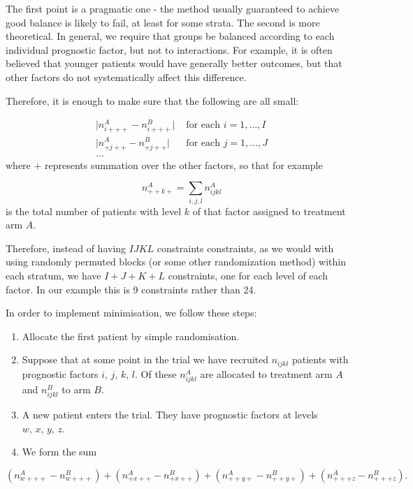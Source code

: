 \documentclass[
  openany]{book}
\providecommand{\tightlist}{%
  \setlength{\itemsep}{0pt}\setlength{\parskip}{0pt}}
\theoremstyle{definition}
\theoremstyle{definition}
\theoremstyle{definition}
\theoremstyle{definition}
\theoremstyle{remark}
\begin{document}
The first point is a pragmatic one - the method usually guaranteed to achieve good balance is likely to fail, at least for some strata. The second is more theoretical. In general, we require that groups be balanced according to each individual prognostic factor, but not to interactions. For example, it is often believed that younger patients would have generally better outcomes, but that other factors do not systematically affect this difference.

Therefore, it is enough to make sure that the following are all small:

\[
\begin{aligned}
\lvert n^A_{i+++} - n^B_{i+++} \rvert&\text{ for each }i=1,\ldots,I\\
\lvert n^A_{+j++} - n^B_{+j++} \rvert&\text{ for each }j=1,\ldots,J\\
\ldots&
\end{aligned}
\]
where \(+\) represents summation over the other factors, so that for example

\[n^A_{++k+} = \sum\limits_{i,j,l}{n^A_{ijkl}}\]
is the total number of patients with level \(k\) of that factor assigned to treatment arm \(A\).

Therefore, instead of having \(IJKL\) constraints constraints, as we would with using randomly permuted blocks (or some other randomization method) within each stratum, we have \(I+J+K+L\) constraints, one for each level of each factor. In our example this is 9 constraints rather than 24.

In order to implement minimisation, we follow these steps:

\begin{enumerate}
\def\labelenumi{\arabic{enumi}.}
\tightlist
\item
  Allocate the first patient by simple randomisation.
\item
  Suppose that at some point in the trial we have recruited \(n_{ijkl}\) patients with prognostic factors \(i,\,j,\,k,\,l\). Of these \(n^A_{ijkl}\) are allocated to treatment arm \(A\) and \(n^B_{ijkl}\) to arm \(B\).
\item
  A new patient enters the trial. They have prognostic factors at levels \(w,\,x,\,y,\,z\).
\item
  We form the sum
\end{enumerate}

\begin{equation}
  \left(n^A_{w+++} - n^B_{w+++}\right) + \left(n^A_{+x++} - n^B_{+x++}\right) + \left(n^A_{++y+} - n^B_{++y+}\right) + \left(n^A_{+++z} - n^B_{+++z}\right).
  \label{eq:minim}
  \end{equation}
\end{document}
